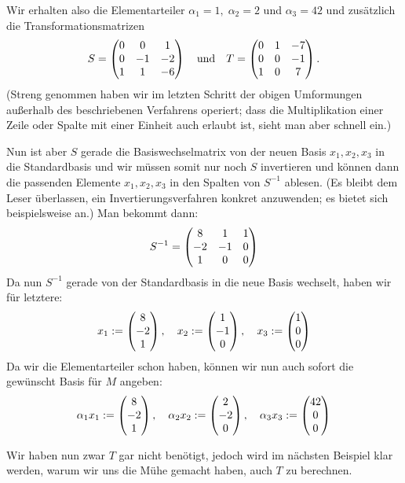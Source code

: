 \begin{thBeisp}
    \medskip
    Wir erhalten also die Elementarteiler $\alpha_1 = 1,\; \alpha_2 = 2$ und
    $\alpha_3 = 42$ und zusätzlich die Transformationsmatrizen
    \[ S = \begin{pmatrix} 
             0 &  0 &  1 \\
             0 & -1 & -2 \\
             1 &  1 & -6   \end{pmatrix} 
       \quad\text{und}\quad
       T = \begin{pmatrix} 
             0 &  1 & -7 \\
             0 &  0 & -1 \\
             1 &  0 &  7   \end{pmatrix}
    . \]
    (Streng genommen haben wir im letzten Schritt der obigen Umformungen
    außerhalb des beschriebenen Verfahrens operiert; dass die Multiplikation
    einer Zeile oder Spalte mit einer Einheit auch erlaubt ist, sieht man aber
    schnell ein.)
    
    Nun ist aber $S$ gerade die Basiswechselmatrix von der neuen Basis
    $x_1,x_2,x_3$ in die Standardbasis und wir müssen somit nur noch $S$
    invertieren und können dann die passenden Elemente $x_1,x_2,x_3$ in den Spalten
    von $S^{-1}$ ablesen. (Es bleibt dem Leser überlassen, ein
    Invertierungsverfahren konkret anzuwenden; es bietet sich beispielsweise
    \cite[2.6]{talk:loh} an.) Man bekommt dann:
    \[ S^{-1} = \begin{pmatrix} 
                     8 &  1 & 1 \\
                    -2 & -1 & 0 \\
                     1 &  0 & 0   \end{pmatrix}  \]
    Da nun $S^{-1}$ gerade von der Standardbasis in die neue Basis wechselt,
    haben wir für letztere:
    \[
        x_1 := \begin{pmatrix} 8\\-2\\1 \end{pmatrix}, \quad 
        x_2 := \begin{pmatrix} 1\\-1\\0 \end{pmatrix}, \quad
        x_3 := \begin{pmatrix} 1\\ 0\\0 \end{pmatrix}    \]
    Da wir die Elementarteiler schon haben, können wir nun auch sofort die
    gewünscht Basis für $M$ angeben:
    \[
        \alpha_1 x_1 := \begin{pmatrix} 8\\-2\\1 \end{pmatrix}, \quad 
        \alpha_2 x_2 := \begin{pmatrix} 2\\-2\\0 \end{pmatrix}, \quad
        \alpha_3 x_3 := \begin{pmatrix} 42\\0\\0 \end{pmatrix}    \]

    Wir haben nun zwar $T$ gar nicht benötigt, jedoch wird im nächsten Beispiel 
    klar werden, warum wir uns die Mühe gemacht haben, auch $T$ zu berechnen.
\end{thBeisp}

